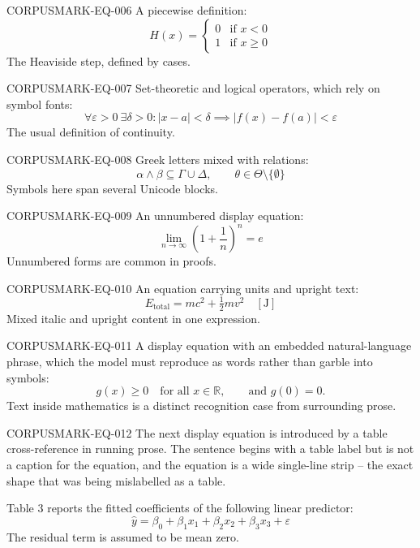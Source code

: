 \documentclass[11pt,a4paper]{article}
\begin{document}
CORPUSMARK-EQ-006 A piecewise definition:
\begin{equation}
H(x) = \begin{cases}
0 & \text{if } x < 0 \\
1 & \text{if } x \geq 0
\end{cases}
\end{equation}
The Heaviside step, defined by cases.

CORPUSMARK-EQ-007 Set-theoretic and logical operators, which rely on symbol fonts:
\begin{equation}
\forall \varepsilon > 0\ \exists \delta > 0 : |x - a| < \delta \implies |f(x) - f(a)| < \varepsilon
\end{equation}
The usual definition of continuity.

CORPUSMARK-EQ-008 Greek letters mixed with relations:
\begin{equation}
\alpha \wedge \beta \subseteq \Gamma \cup \Delta, \qquad \theta \in \Theta \setminus \{\emptyset\}
\end{equation}
Symbols here span several Unicode blocks.

CORPUSMARK-EQ-009 An unnumbered display equation:
\[
\lim_{n \to \infty} \left(1 + \frac{1}{n}\right)^{n} = e
\]
Unnumbered forms are common in proofs.

CORPUSMARK-EQ-010 An equation carrying units and upright text:
\begin{equation}
E_{\text{total}} = mc^{2} + \tfrac{1}{2}mv^{2} \quad [\mathrm{J}]
\end{equation}
Mixed italic and upright content in one expression.

CORPUSMARK-EQ-011 A display equation with an embedded natural-language phrase, which the model
must reproduce as words rather than garble into symbols:
\begin{equation}
g(x) \geq 0 \quad \text{for all } x \in \mathbb{R}, \qquad \text{and } g(0) = 0.
\end{equation}
Text inside mathematics is a distinct recognition case from surrounding prose.

CORPUSMARK-EQ-012 The next display equation is introduced by a table cross-reference in running
prose. The sentence begins with a table label but is not a caption for the equation, and the
equation is a wide single-line strip -- the exact shape that was being mislabelled as a table.

Table 3 reports the fitted coefficients of the following linear predictor:
\begin{equation}
\hat{y} = \beta_{0} + \beta_{1} x_{1} + \beta_{2} x_{2} + \beta_{3} x_{3} + \varepsilon
\end{equation}
The residual term is assumed to be mean zero.
\end{document}
